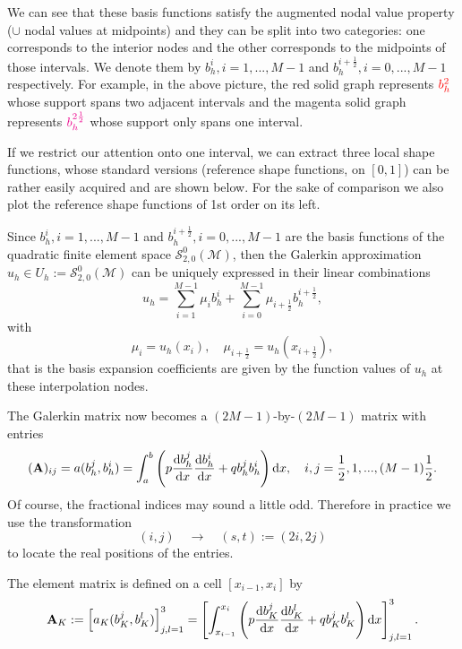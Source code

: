 	We can see that these basis functions satisfy the augmented nodal value
	property ($\cup$ nodal values at midpoints) and they can be split into 
	two categories:
	one corresponds to the interior nodes and the other corresponds to the
	midpoints of those intervals. We denote them by $b_h^i,i=1,...,M-1$ 
	and	$b_h^{i+\frac{1}{2}},i=0,...,M-1$ respectively. For example, in
	the above picture, the red solid graph represents $\textcolor{red}{b_h^2}$
	whose support spans two adjacent intervals and the magenta solid graph 
	represents $\textcolor{magenta}{b_h^{2\frac{1}{2}}}$ whose support only 
	spans one interval.
	
	If we restrict our attention onto one interval, we can extract three local
	shape functions, whose standard versions (reference shape functions, on 
	$[0,1]$) can be rather easily acquired and are shown below. For the sake 
	of comparison we also plot the  reference shape functions of 1st order 
	on its left.	 
	\begin{figure}[!htbp]	
		\centering	
		
	\end{figure}
	
	Since $b_h^i,i=1,...,M-1$ and $b_h^{i+\frac{1}{2}},i=0,...,M-1$
	are the basis functions of the quadratic finite element space 
	$\mathcal{S}_{2,0}^{0}(\mathcal{M})$, then the Galerkin approximation
	$u_h\in U_h:=\mathcal{S}_{2,0}^{0}(\mathcal{M})$ can be uniquely 
	expressed in their linear combinations
	\[u_h=\sum_{i=1}^{M-1}\mu_i b_h^i+
	\sum_{i=0}^{M-1}\mu_{i+\frac{1}{2}} b_h^{i+\frac{1}{2}},\]
	with 
	\[\mu_i=u_h(x_i),\quad \mu_{i+\frac{1}{2}}=u_h(x_{i+\frac{1}{2}}),\]
	that is the basis expansion coefficients are given by the function 
	values of $u_h$ at these interpolation nodes.
	
	The Galerkin matrix now becomes a $(2M-1)$-by-$(2M-1)$	matrix
	with entries
	\[(\mathbf{A})_{ij}=a(b_h^j,b_h^i)=\int_{a}^{b}\left(	
	p\frac{\mathrm{d} b_h^j}{\mathrm{d} x}\frac{\mathrm{d} b_h^i}{\mathrm{d} x}+q b_h^j b_h^i\right)\mathrm{d} x,
	\quad i,j=\frac{1}{2},1,...,(M-1)\frac{1}{2}.\]
	Of course, the fractional indices may sound a little odd. Therefore in
	practice we	use the transformation 
	\[(i,j)\quad \rightarrow \quad (s,t):=(2i,2j)\]
	to locate the real positions of the entries.
	
	The element matrix is defined on a cell $[x_{i-1},x_i]$ by
	\[\mathbf{A}_K:=\left[a_K(b_K^j,b_K^l)\right]_{j,l=1}^{3}=\left[
	\int_{x_{i-1}}^{x_i}\left(	
	p\frac{\mathrm{d} b_K^j}{\mathrm{d} x}\frac{\mathrm{d} b_K^l}{\mathrm{d} x}+q b_K^j b_K^l\right)\mathrm{d} x
	\right]_{j,l=1}^{3}.\]
	
